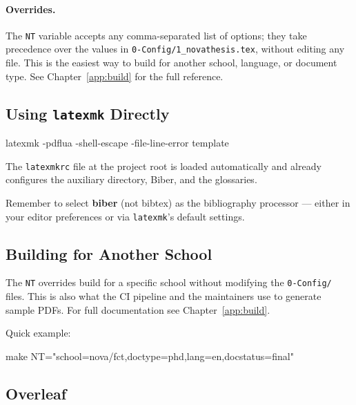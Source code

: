 \paragraph{Overrides.} The \verb!NT! variable accepts any comma-separated
list of \latexinline{\ntsetup} options; they take precedence over the values
in \verb!0-Config/1_novathesis.tex!, without editing any file.  This is the
easiest way to build for another school, language, or document type.  See
Chapter~\ref{app:build} for the full reference.

\subsection{Using \texttt{latexmk} Directly}
\label{sub:latexmk}

\begin{bashcode}
latexmk -pdflua -shell-escape -file-line-error template
\end{bashcode}

The \verb!latexmkrc! file at the project root is loaded automatically and
already configures the auxiliary directory, Biber, and the glossaries.

Remember to select \textbf{biber} (not bibtex) as the bibliography
processor — either in your editor preferences or via
\verb!latexmk!'s default settings.

\subsection{Building for Another School}
\label{sub:build_variants}

The \verb!NT! overrides build for a specific school without modifying the
\verb!0-Config/! files.  This is also what the CI pipeline and the
maintainers use to generate sample PDFs.  For full documentation see
Chapter~\ref{app:build}.

Quick example:
\begin{bashcode}
make NT="school=nova/fct,doctype=phd,lang=en,docstatus=final"
\end{bashcode}

\subsection{Overleaf}
\label{sub:build_overleaf}

